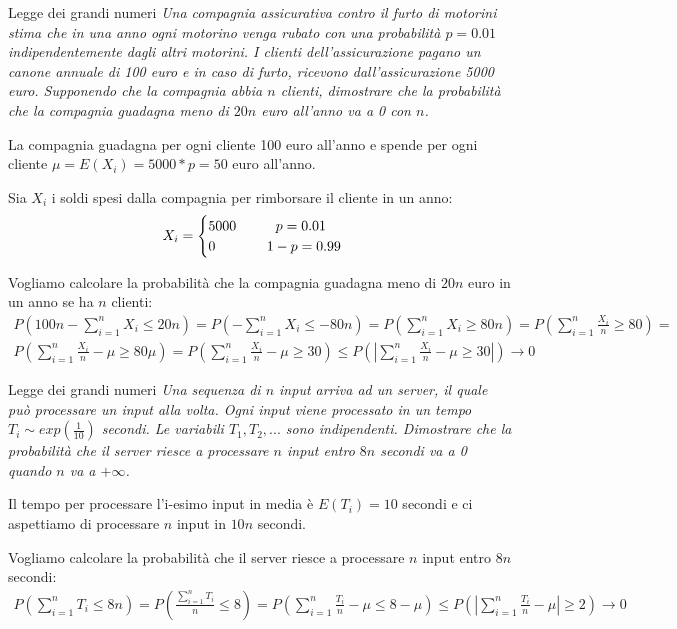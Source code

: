 \begin{Example}{Legge dei grandi numeri}{}
    \textit{Una compagnia assicurativa contro il furto di motorini stima che in una anno ogni motorino venga rubato con una probabilità $p=0.01$ indipendentemente dagli altri motorini. I clienti dell'assicurazione pagano un canone annuale di 100 euro e in caso di furto, ricevono dall'assicurazione 5000 euro. Supponendo che la compagnia abbia $n$ clienti, dimostrare che la probabilità che la compagnia guadagna meno di $20n$ euro all'anno va a 0 con $n$.}

    La compagnia guadagna per ogni cliente 100 euro all'anno e spende per ogni cliente $\mu=E(X_i)=5000*p=50$ euro all'anno.

    Sia $X_i$ i soldi spesi dalla compagnia per rimborsare il cliente in un anno:
    \begin{equation*}
        X_i=\begin{cases}
            5000\hspace{1cm}p=0.01\\0\hspace{1.3cm}1-p=0.99
        \end{cases}
    \end{equation*}

    Vogliamo calcolare la probabilità che la compagnia guadagna meno di $20n$ euro in un anno se ha $n$ clienti:
    \begin{align*}
        P\left(100n-\sum^n_{i=1}X_i\leq 20n\right)=P\left(-\sum^n_{i=1}X_i\leq -80n\right)=P\left(\sum^n_{i=1}X_i\geq 80n\right)=P\left(\sum^n_{i=1}\frac{X_i}{n}\geq 80\right)=\\P\left(\sum^n_{i=1}\frac{X_i}{n}-\mu\geq 80\mu\right)=P\left(\sum^n_{i=1}\frac{X_i}{n}-\mu\geq 30\right)\leq P\left(\left|\sum^n_{i=1}\frac{X_i}{n}-\mu\geq 30\right|\right)\to0
    \end{align*}
\end{Example}

\begin{Example}{Legge dei grandi numeri}{}
    \textit{Una sequenza di $n$ input arriva ad un server, il quale può processare un input alla volta. Ogni input viene processato in un tempo $T_i\sim exp(\frac{1}{10})$ secondi. Le variabili $T_1, T_2, ...$ sono indipendenti. Dimostrare che la probabilità che il server riesce a processare $n$ input entro $8n$ secondi va a 0 quando $n$ va a $+\infty$.}

    Il tempo per processare l'i-esimo input in media è $E(T_i)=10$ secondi e ci aspettiamo di processare $n$ input in $10n$ secondi.

    Vogliamo calcolare la probabilità che il server riesce a processare $n$ input entro $8n$ secondi:
    \begin{align*}
        P\left(\sum^n_{i=1}T_i\leq 8n\right)=P\left(\frac{\sum^n_{i=1}T_i}{n}\leq 8\right)=P\left(\sum^n_{i=1}\frac{T_i}{n}-\mu\leq8-\mu\right)\leq P\left(\left|\sum^n_{i=1}\frac{T_i}{n}-\mu\right|\geq2\right)\to0
    \end{align*}
    
\end{Example}

